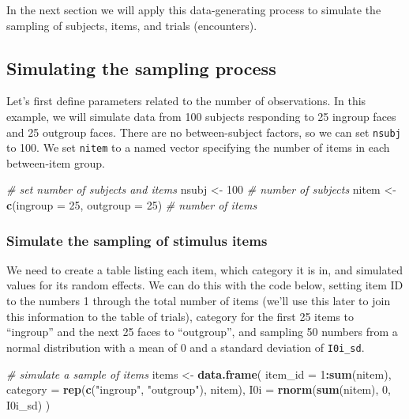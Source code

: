 \documentclass[doc,floatsintext]{apa6}
\newenvironment{Shaded}{\begin{snugshade}}{\end{snugshade}}
\newcommand{\KeywordTok}[1]{\textcolor[rgb]{0.13,0.29,0.53}{\textbf{#1}}}
\newcommand{\DataTypeTok}[1]{\textcolor[rgb]{0.13,0.29,0.53}{#1}}
\newcommand{\DecValTok}[1]{\textcolor[rgb]{0.00,0.00,0.81}{#1}}
\newcommand{\StringTok}[1]{\textcolor[rgb]{0.31,0.60,0.02}{#1}}
\newcommand{\CommentTok}[1]{\textcolor[rgb]{0.56,0.35,0.01}{\textit{#1}}}
\newcommand{\OperatorTok}[1]{\textcolor[rgb]{0.81,0.36,0.00}{\textbf{#1}}}
\newcommand{\NormalTok}[1]{#1}
\begin{document}
\noindent In the next section we will apply this data-generating process
to simulate the sampling of subjects, items, and trials (encounters).

\subsection{Simulating the sampling
process}\label{simulating-the-sampling-process}

Let's first define parameters related to the number of observations. In
this example, we will simulate data from 100 subjects responding to 25
ingroup faces and 25 outgroup faces. There are no between-subject
factors, so we can set \texttt{nsubj} to 100. We set \texttt{nitem} to a
named vector specifying the number of items in each between-item group.

\begin{Shaded}
\begin{Highlighting}[]
\CommentTok{# set number of subjects and items}
\NormalTok{nsubj  <-}\StringTok{ }\DecValTok{100} \CommentTok{# number of subjects}
\NormalTok{nitem  <-}\StringTok{ }\KeywordTok{c}\NormalTok{(}\DataTypeTok{ingroup =} \DecValTok{25}\NormalTok{, }\DataTypeTok{outgroup =} \DecValTok{25}\NormalTok{)  }\CommentTok{# number of items}
\end{Highlighting}
\end{Shaded}

\subsubsection{Simulate the sampling of stimulus
items}\label{simulate-the-sampling-of-stimulus-items}

We need to create a table listing each item, which category it is in,
and simulated values for its random effects. We can do this with the
code below, setting item ID to the numbers 1 through the total number of
items (we'll use this later to join this information to the table of
trials), category for the first 25 items to \enquote{ingroup} and the
next 25 faces to \enquote{outgroup}, and sampling 50 numbers from a
normal distribution with a mean of 0 and a standard deviation of
\texttt{I0i\_sd}.

\begin{Shaded}
\begin{Highlighting}[]
\CommentTok{# simulate a sample of items}
\NormalTok{items <-}\StringTok{ }\KeywordTok{data.frame}\NormalTok{(}
  \DataTypeTok{item_id =} \DecValTok{1}\OperatorTok{:}\KeywordTok{sum}\NormalTok{(nitem),}
  \DataTypeTok{category =} \KeywordTok{rep}\NormalTok{(}\KeywordTok{c}\NormalTok{(}\StringTok{"ingroup"}\NormalTok{, }\StringTok{"outgroup"}\NormalTok{), nitem),}
  \DataTypeTok{I0i =} \KeywordTok{rnorm}\NormalTok{(}\KeywordTok{sum}\NormalTok{(nitem), }\DecValTok{0}\NormalTok{, I0i_sd)}
\NormalTok{)}
\end{Highlighting}
\end{Shaded}
\end{document}
